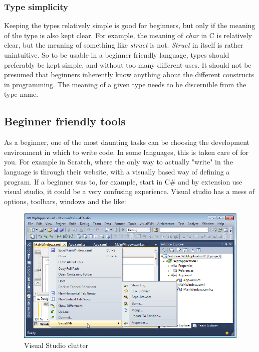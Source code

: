 \subsubsection{Type simplicity}
Keeping the types relatively simple is good for beginners, but only if the meaning of the type is also kept clear. For example, the meaning of \textit{char} in C is relatively clear, but the meaning of something like \textit{struct} is not. \textit{Struct} in itself is rather unintuitive.
So to be usable in a beginner friendly language, types should preferably be kept simple, and without too many different uses. It should not be presumed that beginners inherently know anything about the different constructs in programming. The meaning of a given type needs to be discernible from the type name.
\newpage
\subsection{Beginner friendly tools}
As a beginner, one of the most daunting tasks can be choosing the development environment in which to write code. In some languages, this is taken care of for you. For example in Scratch\cite{scratch}, where the only way to actually "write" in the language is through their website, with a visually based way of defining a program. 
If a beginner was to, for example, start in C\#\cite{CSHARP} and by extension use visual studio, it could be a very confusing experience. Visual studio has a mess of options, toolbars, windows and the like:
\begin{figure}[H]
    \centering
    \includegraphics[scale=0.5]{resources/Images/vsclutter.png}
    \caption{Visual Studio clutter}
    \label{fig:vsclutter}
\end{figure}

